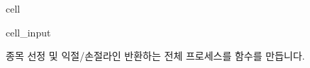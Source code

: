 \documentclass[letterpaper,10pt,english]{jupyterBook}
\begin{document}
\begin{sphinxuseclass}{cell}\begin{sphinxVerbatimInput}

\begin{sphinxuseclass}{cell_input}
\begin{sphinxVerbatim}[commandchars=\\\{\}]
 
    
        
           
    
        
          
    
     
          
\end{sphinxVerbatim}

\end{sphinxuseclass}\end{sphinxVerbatimInput}

\end{sphinxuseclass}
\sphinxAtStartPar
 종목 선정 및 익절/손절라인 반환하는 전체 프로세스를 함수를 만듭니다.
\end{document}
